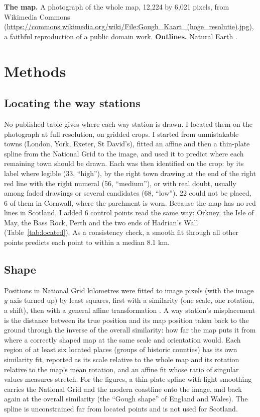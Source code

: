 \documentclass[11pt,a4paper]{article}
\begin{document}
\textbf{The map.} A photograph of the whole map, 12,224 by 6,021 pixels, from Wikimedia Commons (\url{https://commons.wikimedia.org/wiki/File:Gough_Kaart_(hoge_resolutie).jpg}), a faithful reproduction of a public domain work. \textbf{Outlines.} Natural Earth \citep{ne}.

\section{Methods}
\subsection{Locating the way stations}
No published table gives where each way station is drawn. I located them on the photograph at full resolution, on gridded crops. I started from unmistakable towns (London, York, Exeter, St David's), fitted an affine and then a thin-plate spline from the National Grid to the image, and used it to predict where each remaining town should be drawn. Each was then identified on the crop: by its label where legible (33, ``high''), by the right town drawing at the end of the right red line with the right numeral (56, ``medium''), or with real doubt, usually among faded drawings or several candidates (68, ``low''). 22 could not be placed, 6 of them in Cornwall, where the parchment is worn. Because the map has no red lines in Scotland, I added 6 control points read the same way: Orkney, the Isle of May, the Bass Rock, Perth and the two ends of Hadrian's Wall (Table~\ref{tab:located}). As a consistency check, a smooth fit through all other points predicts each point to within a median 8.1 km.

\subsection{Shape}
Positions in National Grid kilometres were fitted to image pixels (with the image $y$ axis turned up) by least squares, first with a similarity (one scale, one rotation, a shift), then with a general affine transformation \citep{tobler}. A way station's misplacement is the distance between its true position and its map position taken back to the ground through the inverse of the overall similarity: how far the map puts it from where a correctly shaped map at the same scale and orientation would. Each region of at least six located places (groups of historic counties) has its own similarity fit, reported as its scale relative to the whole map and its rotation relative to the map's mean rotation, and an affine fit whose ratio of singular values measures stretch. For the figures, a thin-plate spline \citep{bookstein} with light smoothing carries the National Grid and the modern coastline onto the image, and back again at the overall similarity (the ``Gough shape'' of England and Wales). The spline is unconstrained far from located points and is not used for Scotland.
\end{document}
